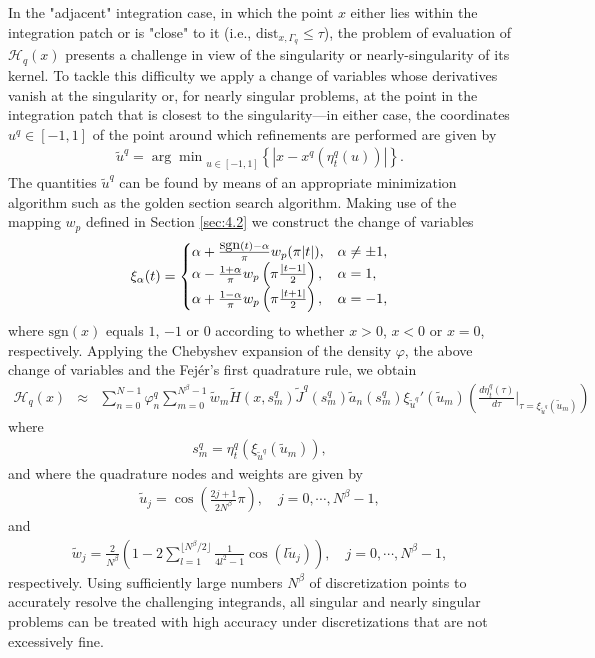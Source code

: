\documentclass[10pt]{article}
\numberwithin{equation}{section}
\newcommand{\be}{\begin{eqnarray}}
\newcommand{\ben}{\begin{eqnarray*}}
\newcommand{\en}{\end{eqnarray}}
\newcommand{\enn}{\end{eqnarray*}}
\begin{document}
In the "adjacent" integration case, in which the point $x$ either lies
within the integration patch or is "close" to it (i.e.,
$\mbox{dist}_{x,\Gamma_q}\le \tau$), the problem of evaluation of
$\mathcal{H}_q(x)$ presents a challenge in view of the singularity or
nearly-singularity of its kernel. To tackle this difficulty we apply a
change of variables whose derivatives vanish at the singularity or,
for nearly singular problems, at the point in the integration patch
that is closest to the singularity---in either case, the coordinates
$u^q\in [-1,1]$ of the point around which refinements are performed
are given by \ben \widetilde{u}^q={\arg\min}_{u\in[-1,1]}
\left\{|x-x^q(\eta_t^q(u))| \right\}.  \enn The quantities
$\widetilde{u}^q$ can be found by means of an appropriate minimization
algorithm such as the golden section search algorithm. Making use of
the mapping $w_p$ defined in Section \ref{sec:4.2} we construct the
change of variables \ben \xi_\alpha(t)=\begin{cases}
  \alpha+\frac{\mbox{sgn}(t)-\alpha}{\pi}w_p(\pi|t|), & \alpha\ne
  \pm1, \cr
  \alpha-\frac{1+\alpha}{\pi}w_p\left(\pi\frac{|t-1|}{2}\right), &
  \alpha=1, \cr
  \alpha+\frac{1-\alpha}{\pi}w_p\left(\pi\frac{|t+1|}{2}\right), &
  \alpha=-1,
\end{cases}
\enn where $\mbox{sgn}(x)$ equals $1$, $-1$ or $0$ according to
whether $x>0$, $x<0$ or $x=0$, respectively. Applying the Chebyshev
expansion of the density $\varphi$, the above change of variables and
the Fej\'er's first quadrature rule, we obtain \be
\label{adjencent}
\mathcal{H}_q(x) &\approx& \sum_{n=0}^{N-1}\varphi_{n}^q \sum_{m=0}^{N^\beta-1} \widetilde{w}_m\widetilde{H}(x,s^q_m) \widetilde{J}^q(s^q_m) \widetilde{a}_n(s^q_m) \xi_{\widetilde{u}^q}'(\widetilde{u}_m) \left(\frac{d\eta_t^q(\tau)}{d\tau}\Big|_{\tau=\xi_{\widetilde{u}^q}(\widetilde{u}_m)}\right)
\en
where
\ben
s^q_m=\eta_t^q(\xi_{\widetilde{u}^q}(\widetilde{u}_m)),
\enn
and where  the quadrature nodes and weights are given by
\ben
\widetilde{u}_j=\cos\left(\frac{2j+1}{2N^\beta}\pi\right),\quad j=0,\cdots,N^\beta-1,
\enn
and
\ben
\widetilde{w}_j=\frac{2}{N^\beta}\left(1-2\sum_{l=1}^{\lfloor N^\beta/2\rfloor} \frac{1}{4l^2-1}\cos(l\widetilde{u}_j)\right),\quad j=0,\cdots,N^\beta-1,
\enn
respectively. Using sufficiently large numbers $N^\beta$ of discretization points to accurately resolve the challenging integrands, all singular and nearly singular problems can be treated with high accuracy under discretizations that are not excessively fine.
\end{document}
